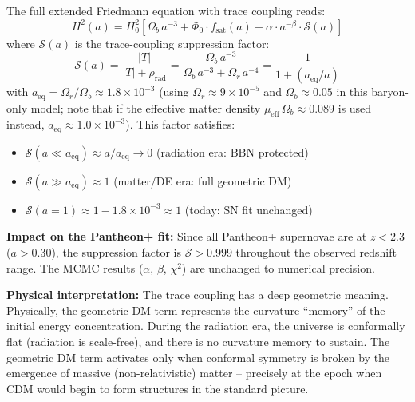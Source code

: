 \documentclass[aps,prd,twocolumn,superscriptaddress,nofootinbib]{revtex4-2}
\begin{document}
The full extended Friedmann equation with trace coupling reads:
\begin{equation}
H^2(a) = H_0^2 \left[\Omega_b\,a^{-3} + \Phi_0 \cdot f_{\mathrm{sat}}(a) + \alpha \cdot a^{-\beta} \cdot \mathcal{S}(a)\right]
\label{eq:extended_cfm_trace}
\end{equation}
where $\mathcal{S}(a)$ is the trace-coupling suppression factor:
\begin{equation}
\mathcal{S}(a) = \frac{|T|}{|T| + \rho_{\mathrm{rad}}} = \frac{\Omega_b\,a^{-3}}{\Omega_b\,a^{-3} + \Omega_r\,a^{-4}}
= \frac{1}{1 + (a_{\mathrm{eq}}/a)}
\label{eq:suppression}
\end{equation}
with $a_{\mathrm{eq}} = \Omega_r/\Omega_b \approx 1.8 \times 10^{-3}$ (using $\Omega_r \approx 9 \times 10^{-5}$ and $\Omega_b \approx 0.05$ in this baryon-only model; note that if the effective matter density $\mu_{\mathrm{eff}}\,\Omega_b \approx 0.089$ is used instead, $a_{\mathrm{eq}} \approx 1.0 \times 10^{-3}$). This factor satisfies:
\begin{itemize}
\item $\mathcal{S}(a \ll a_{\mathrm{eq}}) \approx a/a_{\mathrm{eq}} \to 0$ \quad (radiation era: BBN protected)
\item $\mathcal{S}(a \gg a_{\mathrm{eq}}) \approx 1$ \quad (matter/DE era: full geometric DM)
\item $\mathcal{S}(a = 1) \approx 1 - 1.8\times10^{-3} \approx 1$ \quad (today: SN fit unchanged)
\end{itemize}

\textbf{Impact on the Pantheon+ fit:} Since all Pantheon+ supernovae are at $z < 2.3$ ($a > 0.30$), the suppression factor is $\mathcal{S} > 0.999$ throughout the observed redshift range. The MCMC results ($\alpha$, $\beta$, $\chi^2$) are unchanged to numerical precision.

\textbf{Physical interpretation:} The trace coupling has a deep geometric meaning. Physically, the geometric DM term represents the curvature ``memory'' of the initial energy concentration. During the radiation era, the universe is conformally flat (radiation is scale-free), and there is no curvature memory to sustain. The geometric DM term activates only when conformal symmetry is broken by the emergence of massive (non-relativistic) matter -- precisely at the epoch when CDM would begin to form structures in the standard picture.
\end{document}
